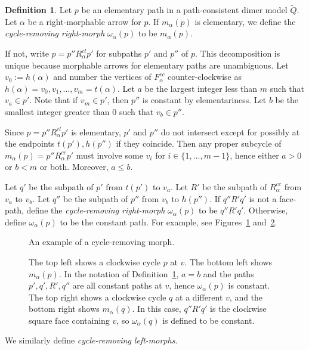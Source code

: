 \documentclass{article}
\theoremstyle{definition}
\newtheorem{defn}[thm]{Definition}
\begin{document}
\begin{defn}\label{defn:cycle-removing-morph}
    Let $p$ be an elementary path in a 
	path-consistent dimer model ${\widetilde Q}$. Let $\alpha$ be a right-morphable arrow for $p$. If $m_\alpha(p)$ is elementary, we define the \textit{cycle-removing right-morph} $\omega_\alpha(p)$ to be $m_\alpha(p)$.

    If not, write $p=p''R_\alpha^{cl}p'$ for subpaths $p'$ and $p''$ of $p$. This decomposition is unique because morphable arrows for elementary paths are unambiguous.
	Let $v_0:=h(\alpha)$ and number the vertices of $F_\alpha^{cc}$ counter-clockwise as $h(\alpha)=v_0,v_1,\dots,v_m=t(\alpha)$. Let $a$ be the largest integer less than $m$ such that $v_a\in p'$. Note that if $v_m\in p'$, then $p''$ is constant by elementariness. Let $b$ be the smallest integer greater than 0 such that $v_b\in p''$.
		
    Since $p=p''R_\alpha^{cl}p'$ is elementary, $p'$ and $p''$ do not intersect except for possibly at the endpoints $t(p'),h(p'')$ if they coincide. Then any proper subcycle of $m_\alpha(p)=p''R_\alpha^{cc}p'$ must involve some $v_i$ for $i\in\{1,\dots,m-1\}$, hence either $a>0$ or $b<m$ or both. Moreover, $a\leq b$. 
    
    Let $q'$ be the subpath of $p'$ from $t(p')$ to $v_a$. Let $R'$ be the subpath of $R_\alpha^{cc}$ from $v_a$ to $v_b$. Let $q''$ be the subpath of $p''$ from $v_b$ to $h(p'')$. 
	If $q''R'q'$ is not a face-path, define the \textit{cycle-removing right-morph} $\omega_\alpha(p)$ to be $q''R'q'$. Otherwise, define $\omega_\alpha(p)$ to be the constant path. For example, see Figures~\ref{fig:cycle-removing-example} and~\ref{fig:cycle-removing-to-constant}.

    \def\svgwidth{300pt}
    \begin{figure}
        \centering
	    
	    \caption{An example of a cycle-removing morph.}
        \label{fig:cycle-removing-example}
    \end{figure}


	\def\svgwidth{300pt}
	\begin{figure}
		\centering
		
		\caption{The top left shows a clockwise cycle $p$ at $v$. The bottom left shows $m_\alpha(p)$. In the notation of Definition~\ref{defn:cycle-removing-morph}, $a=b$ and the paths $p',q',R',q''$ are all constant paths at $v$, hence $\omega_\alpha(p)$ is constant. The top right shows a clockwise cycle $q$ at a different $v$, and the bottom right shows $m_\alpha(q)$. In this case, $q''R'q'$ is the clockwise square face containing $v$, so $\omega_\alpha(q)$ is defined to be constant.}
		\label{fig:cycle-removing-to-constant}
	\end{figure}
    We similarly define \textit{cycle-removing left-morphs}.
\end{defn}
\end{document}
